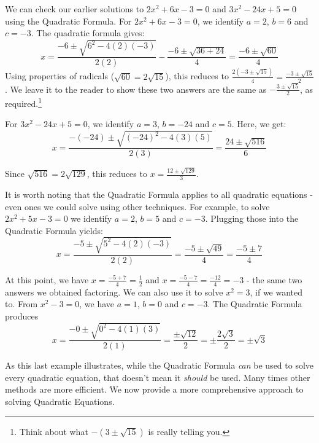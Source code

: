 \documentclass{ximera}
\begin{document}
\medskip

We can check our earlier solutions to $2x^2 + 6x - 3 = 0$ and $3x^2 - 24x + 5 = 0$ using the Quadratic Formula.  For $2x^2 + 6x - 3 = 0$, we identify $a = 2$, $b = 6$ and $c = -3$.  The quadratic formula gives: \[ x = \dfrac{-6 \pm \sqrt{6^2 - 4(2)(-3)}}{2(2)} - \dfrac{-6 \pm \sqrt{36 + 24}}{4} = \dfrac{-6 \pm \sqrt{60}}{4} \] Using properties of radicals ($\sqrt{60} = 2 \sqrt{15}$), this reduces to $\frac{2(-3 \pm \sqrt{15})}{4} =\frac{-3 \pm \sqrt{15}}{2}$. We leave it to the reader to show these two answers are the same as $-\frac{3 \pm \sqrt{15}}{2}$,  as required.\footnote{Think about what $-(3 \pm \sqrt{15})$ is really telling you.}  

\smallskip

For $3x^2 - 24x + 5 = 0$, we identify $a = 3$, $b = -24$ and $c = 5$.  Here, we get: \[ x = \dfrac{-(-24) \pm \sqrt{(-24)^2 - 4(3)(5)}}{2(3)} = \dfrac{24 \pm \sqrt{516}}{6} \]

Since $\sqrt{516} = 2\sqrt{129}$, this reduces to  $x = \frac{12 \pm \sqrt{129}}{3}$. 

\smallskip

It is worth noting that the Quadratic Formula applies to all quadratic equations - even ones we could solve using other techniques.  For example, to solve $2x^2 + 5x - 3 = 0$  we identify $a = 2$, $b = 5$ and $c = -3$.  Plugging those into the Quadratic Formula yields: \[ x = \dfrac{-5 \pm \sqrt{5^2 - 4(2)(-3)}}{2(2)} = \dfrac{-5 \pm \sqrt{49}}{4} = \dfrac{-5 \pm 7}{4} \]

At this point, we have $x = \frac{-5+7}{4} = \frac{1}{2}$ and $x = \frac{-5-7}{4} = \frac{-12}{4} = -3$ - the same two answers we obtained factoring.  We can also use it to solve $x^2 = 3$, if we wanted to.  From $x^2 -3 = 0$, we have $a = 1$, $b = 0$ and $c = -3$.  The Quadratic Formula produces \[ x = \dfrac{-0 \pm \sqrt{0^2 - 4(1)(3)}}{2(1)} = \dfrac{\pm\sqrt{12}}{2} = \pm \dfrac{2\sqrt{3}}{2} = \pm \sqrt{3}\]

As this last example illustrates, while the  Quadratic Formula \textit{can} be used to solve every quadratic equation, that doesn't mean it \textit{should} be used.  Many times other methods are more efficient.  We now provide a more comprehensive approach to solving Quadratic Equations.  

\medskip

\label{solvequadraticeqns}
\end{document}
